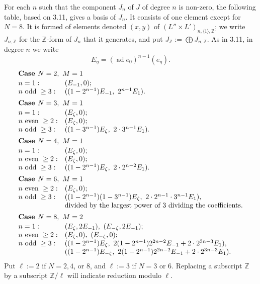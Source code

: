 \documentclass[10pt,a4paper]{article}
\newcommand{\Z}{\mathbb Z}
\newcommand{\ad}{\operatorname{ad}}
\theoremstyle{deligne}
\newcommand{\heading}[1]{\vspace{0.65em}\noindent{\bfseries #1}\quad}
\begin{document}
\heading{4.8.} For each \(n\) such that the component \(J_n\) of \(J\) of degree \(n\) is non-zero, the following table, based on 3.11, gives a basis of \(J_n\). It consists of one element except for \(N=8\). It is formed of elements denoted \((x,y)\) of \((L''\times L')_{n,\langle1\rangle,\Z}\); we write \(J_{n,\Z}\) for the \(\Z\)-form of \(J_n\) that it generates, and put \(J_{\Z}:=\bigoplus J_{n,\Z}\). As in 3.11, in degree \(n\) we write
\[
E_\eta=(\ad e_0)^{n-1}(e_\eta).
\]
\[
\begin{array}{ll}
\multicolumn{2}{l}{\textbf{Case }N=2,\ M=1}\\[0.15em]
n=1: & (E_{-1},0);\\
n\hbox{ odd }\ge3: & ((1-2^{n-1})E_{-1},\ 2^{n-1}E_1).\\[0.45em]
\multicolumn{2}{l}{\textbf{Case }N=3,\ M=1}\\[0.15em]
n=1: & (E_\zeta,0);\\
n\hbox{ even }\ge2: & (E_\zeta,0);\\
n\hbox{ odd }\ge3: & ((1-3^{n-1})E_\zeta,\ 2\cdot3^{n-1}E_1).\\[0.45em]
\multicolumn{2}{l}{\textbf{Case }N=4,\ M=1}\\[0.15em]
n=1: & (E_\zeta,0);\\
n\hbox{ even }\ge2: & (E_\zeta,0);\\
n\hbox{ odd }\ge3: & ((1-2^{n-1})E_\zeta,\ 2\cdot2^{n-2}E_1).\\[0.45em]
\multicolumn{2}{l}{\textbf{Case }N=6,\ M=1}\\[0.15em]
n\hbox{ even }\ge2: & (E_\zeta,0);\\
n\hbox{ odd }\ge3: & ((1-2^{n-1})(1-3^{n-1})E_\zeta,\ 2\cdot2^{n-1}\cdot3^{n-1}E_1),\\
& \text{divided by the largest power of }3\text{ dividing the coefficients}.\\[0.45em]
\multicolumn{2}{l}{\textbf{Case }N=8,\ M=2}\\[0.15em]
n=1: & (E_\zeta,2E_{-1}),\ (E_{-\zeta},2E_{-1});\\
n\hbox{ even }\ge2: & (E_\zeta,0),\ (E_{-\zeta},0);\\
n\hbox{ odd }\ge3: & ((1-2^{n-1})E_\zeta,\ 2(1-2^{n-1})2^{2n-2}E_{-1}+2\cdot2^{3n-3}E_1),\\
& ((1-2^{n-1})E_{-\zeta},\ 2(1-2^{n-1})2^{2n-2}E_{-1}+2\cdot2^{3n-3}E_1).
\end{array}
\]
Put \(\ell:=2\) if \(N=2,4\), or \(8\), and \(\ell:=3\) if \(N=3\) or \(6\). Replacing a subscript \(\Z\) by a subscript \(\Z/\ell\) will indicate reduction modulo \(\ell\).
\end{document}
